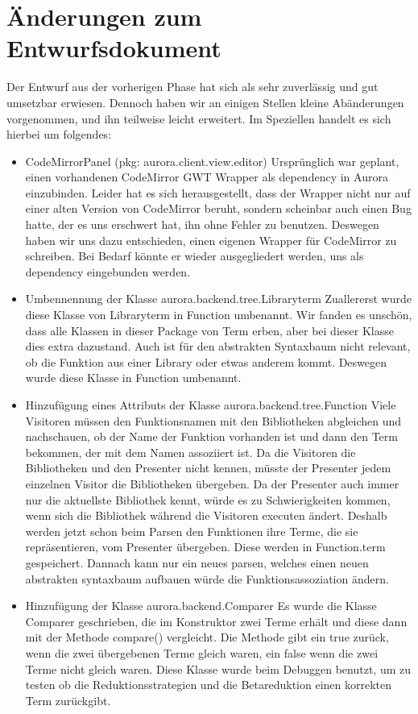 \documentclass[parskip=full,11pt,twoside]{scrartcl}
\begin{document}
\section{Änderungen zum Entwurfsdokument}
Der Entwurf aus der vorherigen Phase hat sich als sehr zuverlässig und gut umsetzbar erwiesen.
Dennoch haben wir an einigen Stellen kleine Abänderungen vorgenommen, und ihn teilweise leicht erweitert.
Im Speziellen handelt es sich hierbei um folgendes:
\begin{itemize}
    \item CodeMirrorPanel (pkg: aurora.client.view.editor)
    \newline
    Ursprünglich war geplant, einen vorhandenen CodeMirror GWT Wrapper als dependency in Aurora einzubinden.
    Leider hat es sich herausgestellt, dass der Wrapper nicht nur auf einer alten Version von CodeMirror beruht, sondern scheinbar auch einen Bug hatte, der es uns erschwert hat, ihn ohne Fehler zu benutzen.
    Deswegen haben wir uns dazu entschieden, einen eigenen Wrapper für CodeMirror zu schreiben.
    Bei Bedarf könnte er wieder ausgegliedert werden, uns als dependency eingebunden werden.
	
	\item Umbennennung der Klasse aurora.backend.tree.Libraryterm
	\newline
	Zuallererst wurde diese Klasse von Libraryterm in Function umbenannt. Wir fanden es unschön, dass alle Klassen in dieser Package von Term erben, aber bei dieser Klasse dies extra dazustand. Auch ist für den abstrakten Syntaxbaum nicht relevant, ob die Funktion aus einer Library oder etwas anderem kommt. Deswegen wurde diese Klasse in Function umbenannt.
	
	\item Hinzufügung eines Attributs der Klasse aurora.backend.tree.Function
	\newline
	Viele Visitoren müssen den Funktionsnamen mit den Bibliotheken abgleichen und nachschauen, ob der Name der Funktion vorhanden ist und 		dann den Term bekommen, der mit dem Namen assoziiert ist. Da die Visitoren die Bibliotheken und den Presenter nicht kennen, müsste der 	Presenter jedem einzelnen Visitor die Bibliotheken übergeben. Da der Presenter auch immer nur die aktuellste Bibliothek kennt, würde 		es zu Schwierigkeiten kommen, wenn sich die Bibliothek während die Visitoren executen ändert. 
	Deshalb werden jetzt schon beim Parsen den Funktionen ihre Terme, die sie repräsentieren, vom Presenter übergeben.
	Diese werden in Function.term gespeichert. Dannach kann nur ein neues parsen, welches einen neuen abstrakten syntaxbaum aufbauen würde 	die Funktionsassoziation ändern.
	\item Hinzufügung der Klasse aurora.backend.Comparer
	\newline
	Es wurde die Klasse Comparer geschrieben, die im Konstruktor zwei Terme erhält und diese dann mit der Methode compare() vergleicht. Die Methode gibt ein true zurück, wenn die zwei übergebenen Terme gleich waren, ein false wenn die zwei Terme nicht gleich waren. Diese Klasse wurde beim Debuggen benutzt, um zu testen ob die Reduktionsstrategien und die Betareduktion einen korrekten Term zurückgibt.
	

\end{itemize}
\end{document}
